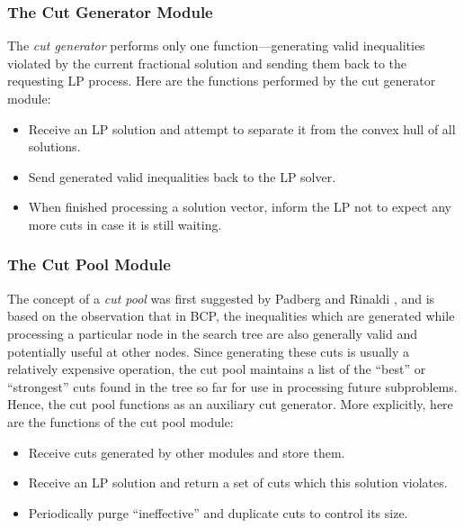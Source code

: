 \subsubsection{The Cut Generator Module}

The {\em cut generator} performs only one function---generating valid
inequalities violated by the current fractional solution and sending
them back to the requesting LP process. Here are the functions
performed by the cut generator module:
\begin{itemize}
        \item Receive an LP solution and attempt to
        separate it from the convex hull of all solutions.
        \item Send generated valid inequalities back to the LP solver.  
        \item When finished processing a solution vector, inform the
        LP not to expect any more cuts in case it is still waiting.
\end{itemize}

\subsubsection{The Cut Pool Module}

The concept of a {\em cut pool} was first suggested by Padberg and
Rinaldi \cite{P&R}, and is based on the observation that in BCP, the
inequalities which are generated while processing a particular node in
the search tree are also generally valid and potentially useful at
other nodes. Since generating these cuts is usually a relatively
expensive operation, the cut pool maintains a list of the ``best'' or
``strongest'' cuts found in the tree so far for use in processing
future subproblems. Hence, the cut pool functions as an auxiliary cut
generator. More explicitly, here are the functions of the cut pool
module:
\begin{itemize}
        \item Receive cuts generated by other modules and store them.
        \item Receive an LP solution and return a
set of cuts which this solution violates.
        \item Periodically purge ``ineffective'' and duplicate cuts
to control its size.
\end{itemize}

